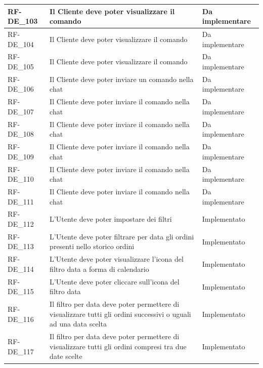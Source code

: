 \begin{longtable}{|>{\raggedright}p{}|>{\raggedright\arraybackslash}p{}|>{\raggedright\arraybackslash}p{}|}
	\hline
	RF-DE\_103 \hypertarget{rf-de_103} & Il Cliente deve poter visualizzare il comando \vr{/invia} & Da implementare \\
	\hline
	RF-DE\_104 \hypertarget{rf-de_104} & Il Cliente deve poter visualizzare il comando \vr{/annulla} & Da implementare \\
	\hline
	RF-DE\_105 \hypertarget{rf-de_105} & Il Cliente deve poter visualizzare il comando \vr{/comandi} & Da implementare \\
	\hline
	RF-DE\_106 \hypertarget{rf-de_106} & Il Cliente deve poter inviare un comando nella chat & Da implementare \\
	\hline
	RF-DE\_107 \hypertarget{rf-de_107} & Il Cliente deve poter inviare il comando \vr{/duplica} nella chat & Da implementare \\
	\hline
	RF-DE\_108 \hypertarget{rf-de_108} & Il Cliente deve poter inviare il comando \vr{/duplica\{xx\}} nella chat & Da implementare \\
	\hline
	RF-DE\_109 \hypertarget{rf-de_109} & Il Cliente deve poter inviare il comando \vr{/invia} nella chat & Da implementare \\
	\hline
	RF-DE\_110 \hypertarget{rf-de_110} & Il Cliente deve poter inviare il comando \vr{/annulla} nella chat & Da implementare \\
	\hline
	RF-DE\_111 \hypertarget{rf-de_111} & Il Cliente deve poter inviare il comando \vr{/comandi} nella chat & Da implementare \\
	\hline
	RF-DE\_112 \hypertarget{rf-de_112} & L'Utente deve poter impostare dei filtri & Implementato \\
	\hline
	RF-DE\_113 \hypertarget{rf-de_113} & L'Utente deve poter filtrare per data gli ordini presenti nello storico ordini & Implementato \\
	\hline
	RF-DE\_114 \hypertarget{rf-de_114} & L'Utente deve poter visualizzare l'icona del filtro data a forma di calendario & Implementato \\
	\hline
	RF-DE\_115 \hypertarget{rf-de_115} & L'Utente deve poter cliccare sull'icona del filtro data & Implementato \\
	\hline
	RF-DE\_116 \hypertarget{rf-de_116} & Il filtro per data deve poter permettere di visualizzare tutti gli ordini successivi o uguali ad una data scelta & Implementato \\
	\hline
	RF-DE\_117 \hypertarget{rf-de_117} & Il filtro per data deve poter permettere di visualizzare tutti gli ordini compresi tra due date scelte & Implementato \\

\end{longtable}
